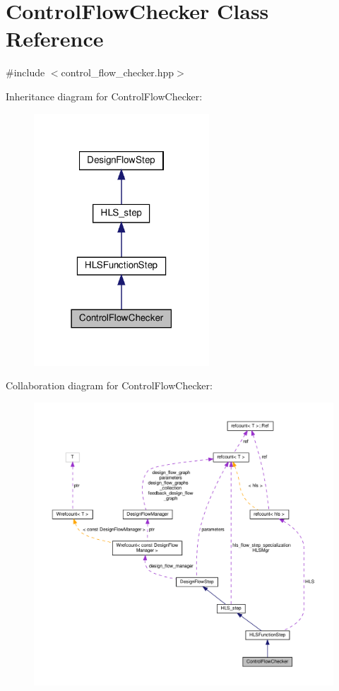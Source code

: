 \hypertarget{classControlFlowChecker}{}\section{Control\+Flow\+Checker Class Reference}
\label{classControlFlowChecker}


{\ttfamily \#include $<$control\+\_\+flow\+\_\+checker.\+hpp$>$}



Inheritance diagram for Control\+Flow\+Checker\+:
\nopagebreak
\begin{figure}[H]
\begin{center}
\leavevmode
\includegraphics[width=186pt]{d2/dde/classControlFlowChecker__inherit__graph}
\end{center}
\end{figure}


Collaboration diagram for Control\+Flow\+Checker\+:
\nopagebreak
\begin{figure}[H]
\begin{center}
\leavevmode
\includegraphics[width=350pt]{d4/d0e/classControlFlowChecker__coll__graph}
\end{center}
\end{figure}
